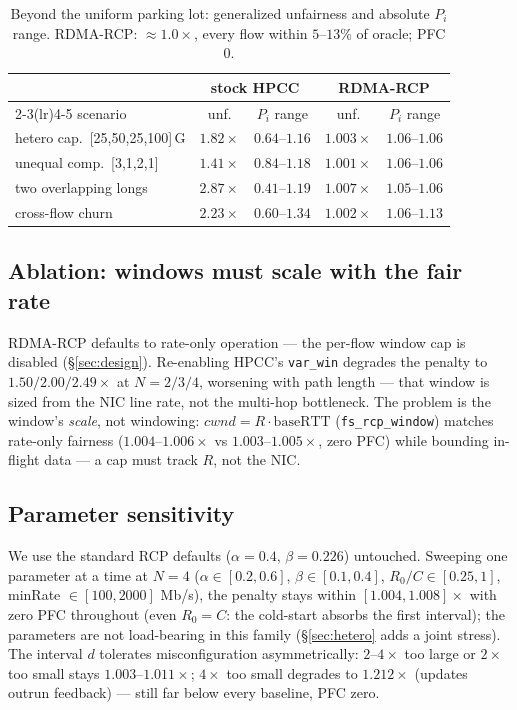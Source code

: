 \documentclass[conference]{IEEEtran}
\newcommand{\hpccfs}{\textsc{RDMA-RCP}\xspace}
\begin{document}
\begin{table}[t]
\caption{Beyond the uniform parking lot: generalized unfairness and absolute $P_i$ range.
\hpccfs: ${\approx}1.0\times$, every flow within $5$--$13\%$ of oracle; PFC 0.}
\label{tab:hetero}
\centering\small
\begin{tabular}{lcccc}
\toprule
 & \multicolumn{2}{c}{stock HPCC} & \multicolumn{2}{c}{\hpccfs} \\
\cmidrule(lr){2-3}\cmidrule(lr){4-5}
scenario & unf. & $P_i$ range & unf. & $P_i$ range \\
\midrule
hetero cap.\ [25,50,25,100]\,G & $1.82\times$ & $0.64$--$1.16$ & $\mathbf{1.003\times}$ & $1.06$--$1.06$ \\
unequal comp.\ [3,1,2,1] & $1.41\times$ & $0.84$--$1.18$ & $\mathbf{1.001\times}$ & $1.06$--$1.06$ \\
two overlapping longs & $2.87\times$ & $0.41$--$1.19$ & $\mathbf{1.007\times}$ & $1.05$--$1.06$ \\
cross-flow churn & $2.23\times$ & $0.60$--$1.34$ & $\mathbf{1.002\times}$ & $1.06$--$1.13$ \\
\bottomrule
\end{tabular}
\end{table}

\subsection{Ablation: windows must scale with the fair rate}
\label{sec:ablation}

\hpccfs defaults to rate-only operation --- the per-flow window cap is disabled
(\S\ref{sec:design}). Re-enabling HPCC's \texttt{var\_win} degrades the penalty to
$1.50/2.00/2.49\times$ at $N = 2/3/4$, worsening with path length --- that window is sized
from the NIC line rate, not the multi-hop bottleneck. The problem is the window's
\emph{scale}, not windowing: $\mathit{cwnd} = R \cdot \mathrm{baseRTT}$
(\texttt{fs\_rcp\_window}) matches rate-only fairness ($1.004$--$1.006\times$ vs
$1.003$--$1.005\times$, zero PFC) while bounding in-flight data --- a cap must track $R$,
not the NIC.

\subsection{Parameter sensitivity}
\label{sec:sensitivity}

We use the standard RCP defaults ($\alpha = 0.4$, $\beta = 0.226$) untouched. Sweeping
one parameter at a time at $N = 4$ ($\alpha \in [0.2, 0.6]$, $\beta \in [0.1, 0.4]$,
$R_0/C \in [0.25, 1]$, minRate $\in [100, 2000]$ Mb/s), the penalty stays within
$[1.004, 1.008]\times$ with zero PFC throughout (even $R_0 = C$: the cold-start absorbs the
first interval); the parameters are not load-bearing in this family (\S\ref{sec:hetero} adds
a joint stress). The interval $d$ tolerates misconfiguration asymmetrically: $2$--$4\times$
too large or $2\times$ too small stays $1.003$--$1.011\times$; $4\times$ too small degrades
to $1.212\times$ (updates outrun feedback) --- still far below every baseline, PFC zero.
\end{document}
